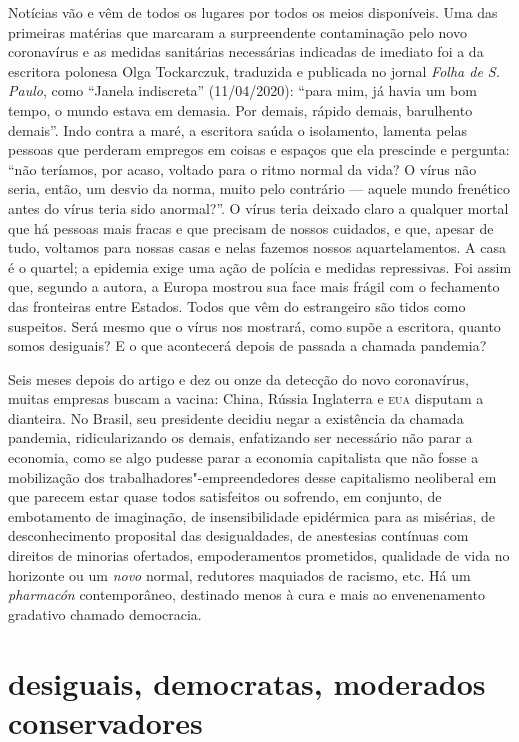 Notícias vão e vêm de todos os lugares por todos os meios disponíveis.
Uma das primeiras matérias que marcaram a surpreendente contaminação
pelo novo coronavírus e as medidas sanitárias necessárias indicadas de
imediato foi a da escritora polonesa Olga Tockarczuk, traduzida e
publicada no jornal \emph{Folha de S. Paulo}, como ``Janela indiscreta''
(11/04/2020): ``para mim, já havia um bom tempo, o mundo estava em
demasia. Por demais, rápido demais, barulhento demais''. Indo contra a
maré, a escritora saúda o isolamento, lamenta pelas pessoas que perderam
empregos em coisas e espaços que ela prescinde e pergunta: ``não
teríamos, por acaso, voltado para o ritmo normal da vida? O vírus não
seria, então, um desvio da norma, muito pelo contrário --- aquele mundo
frenético antes do vírus teria sido anormal?''. O vírus teria deixado
claro a qualquer mortal que há pessoas mais fracas e que precisam de
nossos cuidados, e que, apesar de tudo, voltamos para nossas casas e
nelas fazemos nossos aquartelamentos. A casa é o quartel; a epidemia
exige uma ação de polícia e medidas repressivas. Foi assim que, segundo
a autora, a Europa mostrou sua face mais frágil com o fechamento das
fronteiras entre Estados. Todos que vêm do estrangeiro são tidos como
suspeitos. Será mesmo que o vírus nos mostrará, como supõe a escritora,
quanto somos desiguais? E o que acontecerá depois de passada a chamada
pandemia?

Seis meses depois do artigo e dez ou onze da detecção do novo
coronavírus, muitas empresas buscam a vacina: China, Rússia Inglaterra e
\textsc{eua} disputam a dianteira. No Brasil, seu presidente decidiu negar a
existência da chamada pandemia, ridicularizando os demais, enfatizando
ser necessário não parar a economia, como se algo pudesse parar a
economia capitalista que não fosse a mobilização dos
trabalhadores"-empreendedores desse capitalismo neoliberal em que parecem
estar quase todos satisfeitos ou sofrendo, em conjunto, de embotamento
de imaginação, de insensibilidade epidérmica para as misérias, de
desconhecimento proposital das desigualdades, de anestesias contínuas
com direitos de minorias ofertados, empoderamentos prometidos, qualidade
de vida no horizonte ou um \emph{novo} normal, redutores maquiados de
racismo, etc. Há um \emph{pharmacón} contemporâneo, destinado menos à
cura e mais ao envenenamento gradativo chamado democracia.

\section{desiguais, democratas, moderados conservadores}

